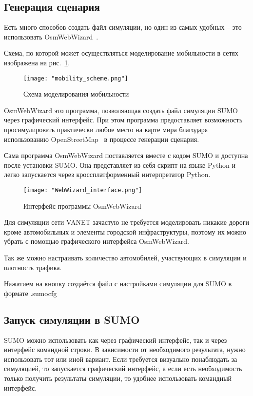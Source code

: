\subsection*{Генерация сценария}

Есть много способов создать файл симуляции, но один из самых удобных – это использовать OsmWebWizard~\cite{osmwebwizard}. 

Схема, по которой может осуществляться моделирование мобильности в сетях изображена на рис.~\ref{fig:mobility_scheme}.

\begin{figure}
 \centering
 \texttt{[image: "mobility\_scheme.png"]}
 \caption{Схема моделирования мобильности}
 \label{fig:mobility_scheme}
\end{figure}

OsmWebWizard это программа, позволяющая создать файл симуляции SUMO через графический интерфейс. При этом программа предоставляет возможность просимулировать практически любое место на карте мира благодаря использованию OpenStreetMap~\cite{osm} в процессе генерации сценария.

Сама программа OsmWebWizard поставляется вместе с кодом SUMO и доступна после установки SUMO. Она представляет из себя скрипт на языке Python и легко запускается через кроссплатформенный интерпретатор Python.

\begin{figure}
 \centering
 \texttt{[image: "WebWizard\_interface.png"]}
 \caption{Интерфейс программы OsmWebWizard}
 \label{fig:webwizard_interface}
\end{figure}

Для симуляции сети VANET зачастую не требуется моделировать никакие дороги кроме автомобильных и элементы городской инфраструктуры, поэтому их можно убрать с помощью графического интерфейса OsmWebWizard. 

Так же можно настраивать количество автомобилей, участвующих в симуляции и плотность трафика.

Нажатием на кнопку  создаётся файл с настройками симуляции для SUMO в формате .sumocfg

\subsection*{Запуск симуляции в SUMO}

SUMO можно использовать как через графический интерфейс, так и через интерфейс командной строки. В зависимости от необходимого результата, нужно использовать тот или иной вариант. Если требуется визуально понаблюдать за симуляцией, то запускается графический интерфейс, а если есть необходимость только получить результаты симуляции, то удобнее использовать командный интерфейс.

